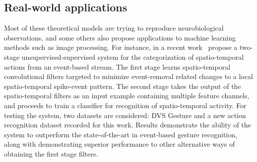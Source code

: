 \documentclass[brainsci, %
               review,submit,pdftex,moreauthors%
               ]{Definitions/mdpi}
\begin{document}







\subsection{Real-world applications}
Most of these theoretical models are trying to reproduce neurobiological observations, and some others also propose applications to machine learning methods such as image processing. For instance, in a recent work~\citet{ghosh_spatiotemporal_2019} propose a two-stage unsupervised-supervised system for the categorization of spatio-temporal actions from an event-based stream. The first stage learns spatio-temporal convolutional filters targeted to minimize event-removal related changes to a local spatio-temporal spike-event pattern. The second stage takes the output of the spatio-temporal filters as an input example containing multiple feature channels, and proceeds to train a classifier for recognition of spatio-temporal activity. For testing the system, two datasets are considered: DVS Gesture and a new action recognition dataset recorded for this work. Results demonstrate the ability of the system to outperform the state-of-the-art in event-based gesture recognition, along with demonstrating superior performance to other alternative ways of obtaining the first stage filters. %
\end{document}
